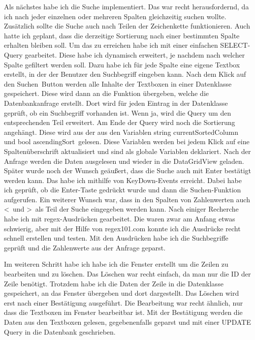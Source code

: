 \documentclass{Vorlage}
\begin{document}
Als nächstes habe ich die Suche implementiert. Das war recht herausfordernd, da ich nach jeder einzelnen oder
mehreren Spalten gleichzeitig suchen wollte. Zusätzlich sollte die Suche auch nach Teilen der Zeichenkette
funktionieren. Auch hatte ich geplant, dass die derzeitige Sortierung nach einer bestimmten Spalte erhalten
bleiben soll. Um das zu erreichen habe ich mit einer einfachen SELECT-Query gearbeitet. Diese habe ich 
dynamisch erweitert, je nachdem nach welcher Spalte gefiltert werden soll. Dazu habe ich für jede Spalte 
eine eigene Textbox erstellt, in der der Benutzer den Suchbegriff eingeben kann. Nach dem Klick auf den
\glqq Suchen\grqq \, Button werden alle Inhalte der Textboxen in einer Datenklasse gespeichert. Diese wird 
dann an die Funktion übergeben, welche die Datenbankanfrage erstellt. Dort wird für jeden Eintrag in der 
Datenklasse geprüft, ob ein Suchbegriff vorhanden ist. Wenn ja, wird die Query um den entsprechenden
Teil erweitert. Am Ende der Query wird noch die Sortierung angehängt. Diese wird aus der aus den Variablen
\glqq string currentSortedColumn\grqq \, und \glqq bool ascendingSort\grqq \, gelesen. Diese Variablen werden
bei jedem Klick auf eine Spaltenüberschrift aktualisiert und sind als globale Variablen deklariert.
Nach der Anfrage werden die Daten ausgelesen und wieder in die DataGridView geladen. Später wurde noch der
Wunsch geäußert, dass die Suche auch mit Enter bestätigt werden kann. Das habe ich mithilfe von KeyDown-Events
erreicht. Dabei habe ich geprüft, ob die Enter-Taste gedrückt wurde und dann die Suchen-Funktion aufgerufen.
Ein weiterer Wunsch war, dass in den Spalten von Zahlenwerten auch \glqq <\grqq \, und \glqq >\grqq \, als
Teil der Suche eingegeben werden kann. 
Nach einiger Recherche habe ich mit regex-Ausdrücken gearbeitet. Die waren zwar am Anfang etwas schwierig, 
aber mit der Hilfe von regex101.com konnte ich die Ausdrücke recht schnell erstellen und testen. Mit den 
Ausdrücken habe ich die Suchbegriffe geprüft und die Zahlenwerte aus der Anfrage geparst. 

Im weiteren Schritt habe ich habe ich die Fenster erstellt um die Zeilen zu bearbeiten und zu löschen.
Das Löschen war recht einfach, da man nur die ID der Zeile benötigt. Trotzdem habe ich die Daten der Zeile 
in die Datenklasse gespeichert, an das Fenster übergeben und dort dargestellt. Das Löschen wird erst nach
einer Bestätigung ausgeführt. Die Bearbeitung war recht ähnlich, nur dass die Textboxen im Fenster
bearbeitbar ist. Mit der Bestätigung werden die Daten aus den Textboxen gelesen, gegebenenfalls geparst und
mit einer UPDATE Query in die Datenbank geschrieben. 
\end{document}
